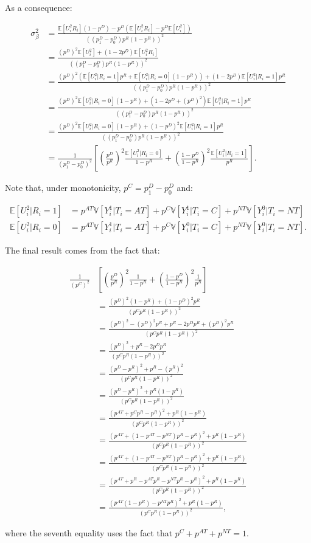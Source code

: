 \documentclass[]{book}
\newcommand{\esp}[1]{\mathbb{E}[ #1 ]}
\newcommand{\var}[1]{\mathbb{V}[ #1 ]}
\theoremstyle{definition}
\theoremstyle{definition}
\theoremstyle{definition}
\theoremstyle{remark}
\begin{document}
As a consequence:

\begin{align*}
\sigma^2_{\beta} & = \frac{\esp{U_i^2R_i}(1-p^D) - p^{D}(\esp{U_i^2R_i}-p^D\esp{U_i^2})}{((p^D_1-p^D_0)p^R(1-p^R))^2} \\
                  & = \frac{(p^D)^2\esp{U_i^2}+(1-2p^D)\esp{U_i^2R_i}}{((p^D_1-p^D_0)p^R(1-p^R))^2}\\
                  & = \frac{(p^D)^2(\esp{U_i^2|R_i=1}p^R+\esp{U_i^2|R_i=0}(1-p^R))+(1-2p^D)\esp{U_i^2|R_i=1}p^R}{((p^D_1-p^D_0)p^R(1-p^R))^2}\\
                  & = \frac{(p^D)^2\esp{U_i^2|R_i=0}(1-p^R)+(1-2p^D+(p^D)^2)\esp{U_i^2|R_i=1}p^R}{((p^D_1-p^D_0)p^R(1-p^R))^2}\\
                  & = \frac{(p^D)^2\esp{U_i^2|R_i=0}(1-p^R)+(1-p^D)^2\esp{U_i^2|R_i=1}p^R}{((p^D_1-p^D_0)p^R(1-p^R))^2}\\
                  & = \frac{1}{(p^D_1-p^D_0)^2}\left[\left(\frac{p^D}{p^R}\right)^2\frac{\esp{U_i^2|R_i=0}}{1-p^R}+\left(\frac{1-p^D}{1-p^R}\right)^2\frac{\esp{U_i^2|R_i=1}}{p^R}\right].
\end{align*}

Note that, under monotonicity, \(p^C=p^D_1-p^D_0\) and:

\begin{align*}
\esp{U_i^2|R_i=1} & = p^{AT}\var{Y_i^1|T_i=AT}+p^C\var{Y_i^1|T_i=C}+p^{NT}\var{Y_i^0|T_i=NT} \\
\esp{U_i^2|R_i=0}  & = p^{AT}\var{Y_i^1|T_i=AT}+p^C\var{Y_i^0|T_i=C}+p^{NT}\var{Y_i^0|T_i=NT}.
 \end{align*}

The final result comes from the fact that:

\begin{align*}
\frac{1}{(p^C)^2} &  \left[\left(\frac{p^D}{p^R}\right)^2\frac{1}{1-p^R}+\left(\frac{1-p^D}{1-p^R}\right)^2\frac{1}{p^R}\right]\\
  & = \frac{(p^D)^2(1-p^R)+(1-p^D)^2p^R}{(p^Cp^R(1-p^R))^2} \\
  & = \frac{(p^D)^2-(p^D)^2p^R+p^R-2p^Dp^R+(p^D)^2p^R}{(p^Cp^R(1-p^R))^2} \\
  & = \frac{(p^D)^2+p^R-2p^Dp^R}{(p^Cp^R(1-p^R))^2} \\
  & = \frac{(p^D-p^R)^2+p^R-(p^R)^2}{(p^Cp^R(1-p^R))^2} \\
  & = \frac{(p^D-p^R)^2+p^R(1-p^R)}{(p^Cp^R(1-p^R))^2} \\
  & = \frac{(p^{AT}+p^Cp^R-p^R)^2+p^R(1-p^R)}{(p^Cp^R(1-p^R))^2} \\
  & = \frac{(p^{AT}+(1-p^{AT}-p^{NT})p^R-p^R)^2+p^R(1-p^R)}{(p^Cp^R(1-p^R))^2} \\
  & = \frac{(p^{AT}+(1-p^{AT}-p^{NT})p^R-p^R)^2+p^R(1-p^R)}{(p^Cp^R(1-p^R))^2} \\
  & = \frac{(p^{AT}+p^R-p^{AT}p^R-p^{NT}p^R-p^R)^2+p^R(1-p^R)}{(p^Cp^R(1-p^R))^2} \\
  & = \frac{(p^{AT}(1-p^R)-p^{NT}p^R)^2+p^R(1-p^R)}{(p^Cp^R(1-p^R))^2},
\end{align*}

where the seventh equality uses the fact that \(p^C+p^{AT}+p^{NT}=1\).
\end{document}
